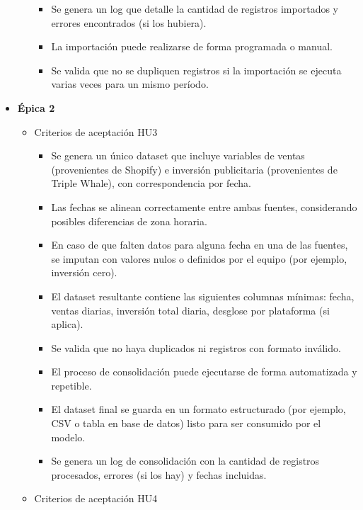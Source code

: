 \documentclass[
11pt, %
]{charter}
\begin{document}
\begin{itemize}
\begin{itemize}
\begin{itemize}
      \item Se genera un log que detalle la cantidad de registros importados y errores encontrados (si los hubiera).

      \item La importación puede realizarse de forma programada o manual.

      \item Se valida que no se dupliquen registros si la importación se ejecuta varias veces para un mismo período.      
      \end{itemize}
      
    \end{itemize}
  \item \textbf{\'{E}pica 2}
    \begin{itemize}
      \item Criterios de aceptación HU3

    \begin{itemize}
    		\item Se genera un único dataset que incluye variables de ventas (provenientes de Shopify) e inversión publicitaria (provenientes de Triple Whale), con correspondencia por fecha.

		\item Las fechas se alinean correctamente entre ambas fuentes, considerando posibles diferencias de zona horaria.

		\item En caso de que falten datos para alguna fecha en una de las fuentes, se imputan con valores nulos o definidos por el equipo (por ejemplo, inversión cero).

		\item El dataset resultante contiene las siguientes columnas mínimas: fecha, ventas diarias, inversión total diaria, desglose por plataforma (si aplica).

		\item Se valida que no haya duplicados ni registros con formato inválido.

		\item El proceso de consolidación puede ejecutarse de forma automatizada y repetible.

		\item El dataset final se guarda en un formato estructurado (por ejemplo, CSV o tabla en base de datos) listo para ser consumido por el modelo.

		\item Se genera un log de consolidación con la cantidad de registros procesados, errores (si los hay) y fechas incluidas.      
    \end{itemize}      
      \item Criterios de aceptación HU4
      

\end{itemize}
\end{itemize}
\end{document}
